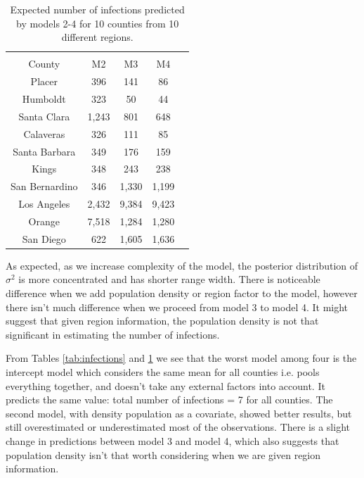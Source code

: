 \documentclass[11pt,twocolumn]{asaproc}
\begin{document}
\begin{table}
\caption{Expected number of infections predicted by models 2-4 for 10 counties from 10 different regions.}
\label{tab:infectionss}
\begin{center}
\begin{tabular}{ccccc}
\hline
\hline
\\[-5pt]
\multicolumn{1}{c}{County} &
\multicolumn{1}{c}{M2} &
\multicolumn{1}{c}{M3} &
\multicolumn{1}{c}{M4}\\
\hline
Placer&	396&   141 & 86\\
Humboldt&     323&  50 &	 44\\
Santa Clara&	1,243& 801	& 648\\
Calaveras&     326&  111 & 85\\
Santa Barbara&     349& 176 & 159\\
Kings&     348& 243 & 238\\
San Bernardino&     346& 1,330 & 1,199\\
Los Angeles&     2,432& 9,384 & 9,423\\
Orange&     7,518& 1,284 & 1,280\\
San Diego&     622& 1,605 & 1,636\\
\hline
\end{tabular}
\end{center}
\end{table}

As expected, as we increase complexity of the model, the posterior distribution of $\sigma^2$ is more concentrated and has shorter range width. There is noticeable difference when we add population density or region factor to the model, however there isn't much difference when we proceed from model 3 to model 4. It might suggest that given region information, the population density is not that significant in estimating the number of infections. 


From Tables \ref{tab:infections} and \ref{tab:infectionss} we see that the worst model among four is the intercept model which considers the same mean for all counties i.e. pools everything together, and doesn't take any external factors into account. It predicts the same value: total number of infections = 7 for all counties. The second model, with density population as a covariate, showed better results, but still overestimated or underestimated most of the observations. There is a slight change in predictions between model 3 and model 4, which also suggests that population density isn't that worth considering when we are given region information. 
\end{document}
